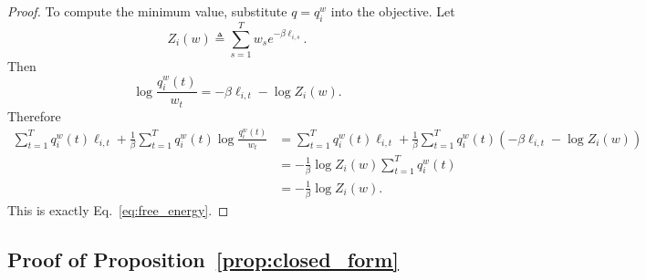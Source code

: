 \documentclass{article}
\begin{document}
\begin{proof}
To compute the minimum value, substitute \(q=q_i^w\) into the objective. Let
\begin{equation}
    Z_i(w) \triangleq \sum_{s=1}^{T} w_s e^{-\beta \ell_{i,s}}.
\end{equation}
Then
\begin{equation}
    \log \frac{q_i^w(t)}{w_t}
    =
    -\beta \ell_{i,t} - \log Z_i(w).
\end{equation}
Therefore
\begin{align}
    \sum_{t=1}^{T} q_i^w(t)\ell_{i,t}
    +
    \frac{1}{\beta}\sum_{t=1}^{T} q_i^w(t)\log \frac{q_i^w(t)}{w_t}
    &=
    \sum_{t=1}^{T} q_i^w(t)\ell_{i,t}
    +
    \frac{1}{\beta}\sum_{t=1}^{T} q_i^w(t)\left(-\beta \ell_{i,t} - \log Z_i(w)\right) \\
    &=
    -\frac{1}{\beta}\log Z_i(w)\sum_{t=1}^{T} q_i^w(t) \\
    &=
    -\frac{1}{\beta}\log Z_i(w).
\end{align}
This is exactly Eq.~\eqref{eq:free_energy}. \qedhere
\end{proof}

\subsection{Proof of Proposition~\ref{prop:closed_form}}
\end{document}
